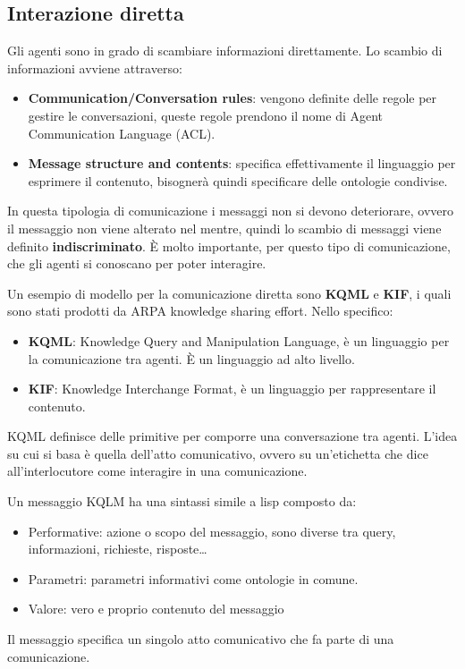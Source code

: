 \subsection{Interazione diretta}
Gli agenti sono in grado di scambiare informazioni direttamente. Lo scambio di
informazioni avviene attraverso:
\begin{itemize}
    \item \textbf{Communication/Conversation rules}: vengono definite delle
          regole per gestire le conversazioni, queste regole prendono il nome di
          Agent Communication Language (ACL).
    \item \textbf{Message structure and contents}: specifica effettivamente il
          linguaggio per esprimere il contenuto, bisognerà quindi specificare
          delle ontologie condivise.
\end{itemize}

In questa tipologia di comunicazione i messaggi non si devono deteriorare, ovvero
il messaggio non viene alterato nel mentre, quindi lo scambio di messaggi viene
definito \textbf{indiscriminato}. È molto importante, per questo tipo di
comunicazione, che gli agenti si conoscano per poter interagire.
\begin{esempio}
    Un esempio di modello per la comunicazione diretta sono \textbf{KQML} e
    \textbf{KIF}, i quali sono stati prodotti da ARPA knowledge sharing effort.
    Nello specifico:
    \begin{itemize}
        \item \textbf{KQML}: Knowledge Query and Manipulation Language, è un
              linguaggio per la comunicazione tra agenti. È un linguaggio ad
              alto livello.
        \item \textbf{KIF}: Knowledge Interchange Format, è un linguaggio per
              rappresentare il contenuto.
    \end{itemize}

    KQML definisce delle primitive per comporre una conversazione tra agenti.
    L'idea su cui si basa è quella dell'atto comunicativo, ovvero su un'etichetta
    che dice all'interlocutore come interagire in una comunicazione.

    Un messaggio KQLM ha una sintassi simile a lisp composto da:
    \begin{itemize}
        \item Performative: azione o scopo del messaggio, sono diverse tra query,
              informazioni, richieste, risposte\dots
        \item Parametri: parametri informativi come ontologie in comune.
        \item Valore: vero e proprio contenuto del messaggio
    \end{itemize}
    Il messaggio specifica un singolo atto comunicativo che fa parte di una comunicazione.
\end{esempio}

